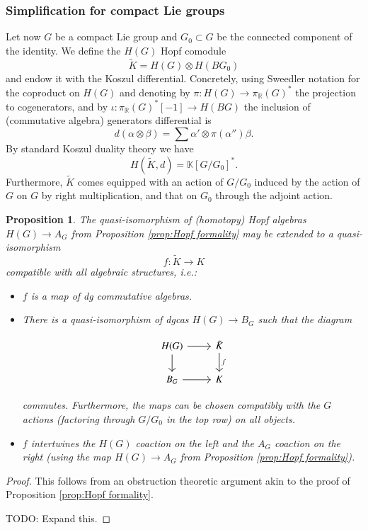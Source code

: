 \documentclass[a4paper]{amsart}
\theoremstyle{plain}
\newtheorem{prop}[thm]{Proposition}
\theoremstyle{definition}
\newcommand{\R}{{\mathbb{R}}}
\newcommand{\K}{{\mathbb{K}}}
\newcommand{\beq}[1]{
\begin{equation}\label{#1}
}
\newcommand{\eeq}{
\end{equation}
}
\begin{document}
\newcommand{\HK}{\tilde K}
\subsubsection{Simplification for compact Lie groups }\label{sec:Koszul cx for compact Lie}
Let now $G$ be a compact Lie group and $G_0\subset G$ be the connected component of the identity.
We define the $H(G)$ Hopf comodule 
$$
\HK = H(G) \otimes H(BG_0)
$$
and endow it with the Koszul differential. Concretely, using Sweedler notation for the coproduct on $H(G)$ and denoting by $\pi:H(G)\to \pi_{\R}(G)^*$ the projection to cogenerators, and 
by $\iota:\pi_{\R}(G)^*[-1]\to H(BG)$ the inclusion of (commutative algebra) generators differential is
$$
d(\alpha\otimes \beta) = \sum \alpha' \otimes \pi(\alpha'')\beta.
$$
By standard Koszul duality theory we have
\[
 H(\HK,d) = \K[G/G_0]^*.
\]
Furthermore, $\HK$ comes equipped with an action of $G/G_0$ induced by the action of $G$ on $G$ by right multiplication, and that on $G_0$ through the adjoint action.
\begin{prop}
The quasi-isomorphism of (homotopy) Hopf algebras $H(G)\to A_G$ from Proposition \ref{prop:Hopf formality} may be extended to a quasi-isomorphism
\[
 f : \HK \to K
\]
compatible with all algebraic structures, i.e.:
\begin{itemize}
 \item $f$ is a map of dg commutative algebras.
 \item There is a quasi-isomorphism of dgcas $H(G)\to B_G$ such that the diagram
\beq{equ:KtK1}
 \begin{tikzcd}
  H(G) \ar{r} \ar{d} & \HK \ar{d}{f} \\
B_G \ar{r} & K
 \end{tikzcd}
\eeq
commutes.
Furthermore, the maps can be chosen compatibly with the $G$ actions (factoring through $G/G_0$ in the top row) on all objects.
 \item $f$ intertwines the $H(G)$ coaction on the left and the $A_G$ coaction on the right (using the map $H(G)\to A_G$ from Proposition \ref{prop:Hopf formality}).
\end{itemize}
\end{prop}
\begin{proof}
This follows from an obstruction theoretic argument akin to the proof of Proposition \ref{prop:Hopf formality}.

TODO: Expand this.
\end{proof}
\end{document}
